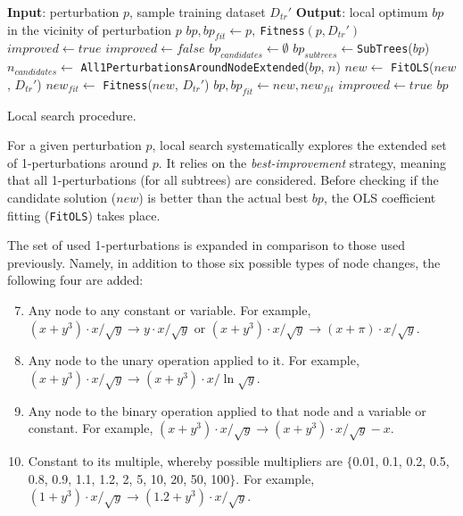 \documentclass{bmcart}
\begin{document}
\begin{algorithm}
 
	\begin{algorithmic}[1] 
		\Statex \textbf{Input}: perturbation $p$, sample training dataset $D_{tr}'$   
		\Statex \textbf{Output}: local optimum $bp$ in the vicinity of perturbation $p$
		\State $bp, bp_{fit} \gets p,\ $\texttt{Fitness}$(p,D_{tr}')$ 
		\State $improved \gets true$
		\State $improved \gets false$
		\State $bp_{candidates} \gets \emptyset$
		\State $bp_{subtrees} \gets $\texttt{SubTrees}($bp$)
		\State $n_{candidates} \gets $ \texttt{All1PerturbationsAroundNodeExtended}($bp$, $n$)
		\State $new \gets$ \texttt{FitOLS}($new$, $D_{tr}'$)
		\State $new_{fit} \gets$ \texttt{Fitness}($new$, $D_{tr}'$)
		\State $bp, bp_{fit} \gets new, new_{fit}$
		\State $improved \gets true$
		\EndIf
		\EndFor
		\EndFor
		\EndWhile
		\State \Return $bp$
		\EndProcedure
	\end{algorithmic}
	\caption{Local search procedure.}
	\label{alg:ls}
\end{algorithm}  

For a given perturbation $p$, local search systematically explores the extended set of 1-perturbations around $p$. It relies on the \emph{best-improvement} strategy, meaning that all 1-perturbations (for all subtrees) are considered. Before checking if the candidate solution ($new$) is better than the actual best $bp$, the OLS coefficient fitting (\texttt{FitOLS}) takes place.  


The set of used 1-perturbations is expanded in comparison to those used previously. Namely, in addition to those six possible types of node changes, the following four are added:

\begin{enumerate}
	\setcounter{enumi}{6}
	\item Any node to any constant or variable. For example, $(x+y^3)\cdot x/\sqrt{y} \rightarrow y \cdot x / \sqrt{y}$ or  $(x+y^3)\cdot x/\sqrt{y} \rightarrow (x+\pi) \cdot x / \sqrt{y}$.
	\item Any node to the unary operation applied to it. For example, $(x+y^3)\cdot x/\sqrt{y} \rightarrow (x+y^3)\cdot x/\ln{\sqrt{y}}$.
	\item Any node to the binary operation applied to that node and a variable or constant. For example, $(x+y^3)\cdot x/\sqrt{y} \rightarrow (x+y^3)\cdot x/\sqrt{y} - x$.
	\item Constant to its multiple, whereby possible multipliers are $\{$0.01, 0.1, 0.2, 0.5, 0.8, 0.9, 1.1, 1.2, 2, 5, 10, 20, 50, 100$\}$. For example, $(1+y^3)\cdot x/\sqrt{y} \rightarrow (1.2+y^3)\cdot x/\sqrt{y}$.
\end{enumerate}
\end{document}
